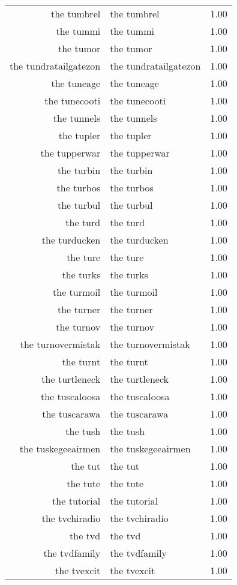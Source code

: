 \begin{table}[ht]
\begin{tabular}{rlr}
  the tumbrel & the tumbrel & 1.00 \\ 
  the tummi & the tummi & 1.00 \\ 
  the tumor & the tumor & 1.00 \\ 
  the tundratailgatezon & the tundratailgatezon & 1.00 \\ 
  the tuneage & the tuneage & 1.00 \\ 
  the tunecooti & the tunecooti & 1.00 \\ 
  the tunnels & the tunnels & 1.00 \\ 
  the tupler & the tupler & 1.00 \\ 
  the tupperwar & the tupperwar & 1.00 \\ 
  the turbin & the turbin & 1.00 \\ 
  the turbos & the turbos & 1.00 \\ 
  the turbul & the turbul & 1.00 \\ 
  the turd & the turd & 1.00 \\ 
  the turducken & the turducken & 1.00 \\ 
  the ture & the ture & 1.00 \\ 
  the turks & the turks & 1.00 \\ 
  the turmoil & the turmoil & 1.00 \\ 
  the turner & the turner & 1.00 \\ 
  the turnov & the turnov & 1.00 \\ 
  the turnovermistak & the turnovermistak & 1.00 \\ 
  the turnt & the turnt & 1.00 \\ 
  the turtleneck & the turtleneck & 1.00 \\ 
  the tuscaloosa & the tuscaloosa & 1.00 \\ 
  the tuscarawa & the tuscarawa & 1.00 \\ 
  the tush & the tush & 1.00 \\ 
  the tuskegeeairmen & the tuskegeeairmen & 1.00 \\ 
  the tut & the tut & 1.00 \\ 
  the tute & the tute & 1.00 \\ 
  the tutorial & the tutorial & 1.00 \\ 
  the tvchiradio & the tvchiradio & 1.00 \\ 
  the tvd & the tvd & 1.00 \\ 
  the tvdfamily & the tvdfamily & 1.00 \\ 
  the tvexcit & the tvexcit & 1.00 \\ 

\end{tabular}
\end{table}
